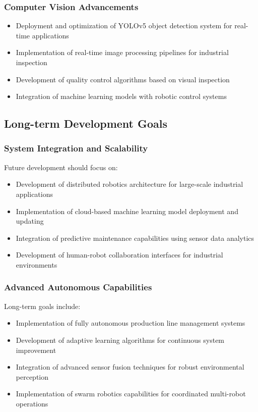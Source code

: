 \documentclass{book}
\begin{document}
\subsubsection{Computer Vision Advancements}
\begin{itemize}
\item Deployment and optimization of YOLOv5 object detection system for real-time applications
\item Implementation of real-time image processing pipelines for industrial inspection
\item Development of quality control algorithms based on visual inspection
\item Integration of machine learning models with robotic control systems
\end{itemize}

\subsection{Long-term Development Goals}

\subsubsection{System Integration and Scalability}
\par\noindent Future development should focus on:

\begin{itemize}
\item Development of distributed robotics architecture for large-scale industrial applications
\item Implementation of cloud-based machine learning model deployment and updating
\item Integration of predictive maintenance capabilities using sensor data analytics
\item Development of human-robot collaboration interfaces for industrial environments
\end{itemize}

\subsubsection{Advanced Autonomous Capabilities}
\par\noindent Long-term goals include:

\begin{itemize}
\item Implementation of fully autonomous production line management systems
\item Development of adaptive learning algorithms for continuous system improvement
\item Integration of advanced sensor fusion techniques for robust environmental perception
\item Implementation of swarm robotics capabilities for coordinated multi-robot operations
\end{itemize}
\end{document}
